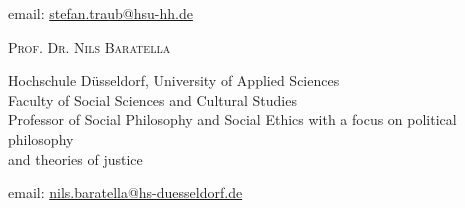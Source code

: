 \documentclass[a4paper,10pt]{article}
\begin{document}
email: \href{mailto:stefan.traub@hsu-hh.de}{stefan.traub@hsu-hh.de}\vspace{12pt}

\textsc{Prof\hspace{0.5pt}. Dr\hspace{0.5pt}. Nils Baratella}

Hochschule Düsseldorf, University of Applied Sciences\\
Faculty of Social Sciences and Cultural Studies\\
Professor of Social Philosophy and Social Ethics with a focus on political philosophy\\
and theories of justice

email: \href{mailto:nils.baratella@hs-duesseldorf.de}{nils.baratella@hs-duesseldorf.de}
\end{document}
